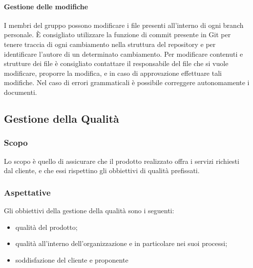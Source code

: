 			\paragraph{Gestione delle modifiche}
			I membri del gruppo possono modificare i file presenti all'interno di ogni branch personale. È consigliato utilizzare la funzione di commit presente in Git per tenere traccia di ogni cambiamento nella struttura del repository e per identificare l'autore di un determinato cambiamento. Per modificare contenuti e strutture dei file è consigliato contattare il responsabile del file che si vuole modificare, proporre la modifica, e in caso di approvazione effettuare tali modifiche. Nel caso di errori grammaticali è possibile correggere autonomamente i documenti. 
	
	\subsection{Gestione della Qualità}
		\subsubsection{Scopo}
		Lo scopo è quello di assicurare che il prodotto realizzato offra i servizi richiesti dal cliente, e che essi rispettino gli obbiettivi di qualità prefissati.
		
		\subsubsection{Aspettative}
		Gli obbiettivi della gestione della qualità sono i seguenti:
		\begin{itemize}
			\item qualità del prodotto;
			\item qualità all'interno dell'organizzazione e in particolare nei suoi processi;
			\item soddisfazione del cliente e proponente
		\end{itemize}
		
